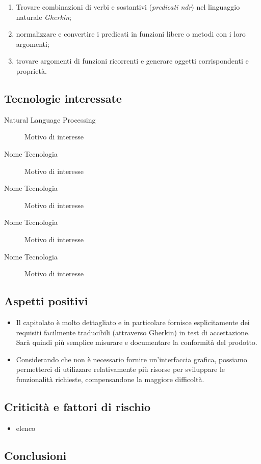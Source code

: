 \documentclass[../studio-di-fattibilita.tex]{subfiles}
\begin{document}
    \begin{enumerate}
      \item Trovare combinazioni di verbi e sostantivi (\textit{predicati ndr}) nel
      linguaggio naturale \textit{Gherkin};
      \item normalizzare e convertire i predicati in funzioni libere o metodi con i loro argomenti;
      \item trovare argomenti di funzioni ricorrenti e generare oggetti corrispondenti e proprietà.
    \end{enumerate}



  \subsection{Tecnologie interessate} \label{sec:tecnologie_interessate}

  \begin{description}
    \item[Natural Language Processing] Motivo di interesse
    \item[Nome Tecnologia] Motivo di interesse
    \item[Nome Tecnologia] Motivo di interesse
    \item[Nome Tecnologia] Motivo di interesse
    \item[Nome Tecnologia] Motivo di interesse
  \end{description}



  \subsection{Aspetti positivi} \label{sec:aspetti_positivi}

  \begin{itemize}
    \item Il capitolato è molto dettagliato e in particolare fornisce esplicitamente dei requisiti facilmente traducibili (attraverso Gherkin) in test di accettazione. Sarà quindi più semplice misurare e documentare la conformità del prodotto.
    \item Considerando che non è necessario fornire un'interfaccia grafica, possiamo permetterci di utilizzare relativamente più risorse per sviluppare le funzionalità richieste, compensandone la maggiore difficoltà.
  \end{itemize}


  \subsection{Criticità e fattori di rischio} \label{sec:criticità_e_fattori_di_rischio}

  \begin{itemize}
    \item elenco
  \end{itemize}



  \subsection{Conclusioni} \label{sec:conclusioni}

\end{document}

